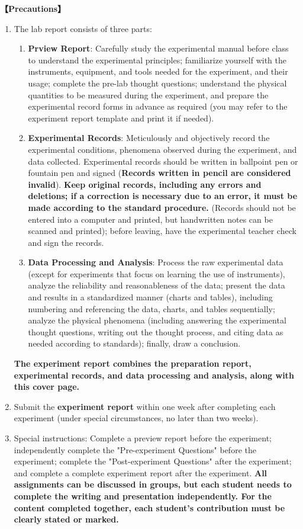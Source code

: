 \textbf{【Precautions】}
\begin{enumerate}
	\item The lab report consists of three parts:
	\begin{enumerate}
		\item \textbf{Prview Report}: Carefully study the experimental manual before class to understand the experimental principles; familiarize yourself with the instruments, equipment, and tools needed for the experiment, and their usage; complete the pre-lab thought questions; understand the physical quantities to be measured during the experiment, and prepare the experimental record forms in advance as required (you may refer to the experiment report template and print it if needed).
		\item \textbf{Experimental Records}: Meticulously and objectively record the experimental conditions, phenomena observed during the experiment, and data collected. Experimental records should be written in ballpoint pen or fountain pen and signed (\textcolor{fred}{\textbf{Records written in pencil are considered invalid}}). \textcolor{fred}{\textbf{Keep original records, including any errors and deletions; if a correction is necessary due to an error, it must be made according to the standard procedure.}} (Records should not be entered into a computer and printed, but handwritten notes can be scanned and printed); before leaving, have the experimental teacher check and sign the records. 
		\item \textbf{Data Processing and Analysis}: Process the raw experimental data (except for experiments that focus on learning the use of instruments), analyze the reliability and reasonableness of the data; present the data and results in a standardized manner (charts and tables), including numbering and referencing the data, charts, and tables sequentially; analyze the physical phenomena (including answering the experimental thought questions, writing out the thought process, and citing data as needed according to standards); finally, draw a conclusion.
	\end{enumerate}
	\textbf{The experiment report combines the preparation report, experimental records, and data processing and analysis, along with this cover page.}
	\item Submit the \textbf{experiment report} within one week after completing each experiment (under special circumstances, no later than two weeks).
	\item Special instructions: Complete a preview report before the experiment; independently complete the "Pre-experiment Questions" before the experiment; complete the "Post-experiment Questions" after the experiment; and complete a complete experiment report after the experiment. \textcolor{fred}{\textbf{All assignments can be discussed in groups, but each student needs to complete the writing and presentation independently. For the content completed together, each student's contribution must be clearly stated or marked.}}
\end{enumerate}


